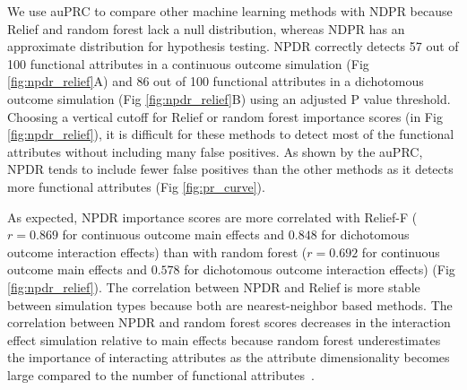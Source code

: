 \documentclass[10pt]{article}
\begin{document}
We use auPRC to compare other machine learning methods with NDPR because Relief and random forest lack a null distribution, whereas NDPR has an approximate distribution for hypothesis testing. NPDR correctly detects 57 out of 100 functional attributes in a continuous outcome simulation (Fig \ref{fig:npdr_relief}A) and 86 out of 100 functional attributes in a dichotomous outcome simulation (Fig \ref{fig:npdr_relief}B) using an adjusted P value threshold. Choosing a vertical cutoff for Relief or random forest importance scores (in Fig \ref{fig:npdr_relief}), it is difficult for these methods to detect most of the functional attributes without including many false positives. As shown by the auPRC, NPDR tends to include fewer false positives than the other methods as it detects more functional attributes (Fig \ref{fig:pr_curve}).

As expected, NPDR importance scores are more correlated with Relief-F ($r = 0.869$ for continuous outcome main effects and $0.848$ for dichotomous outcome interaction effects) than with random forest ($r = 0.692$ for continuous outcome main effects and $0.578$ for dichotomous outcome interaction effects) (Fig \ref{fig:npdr_relief}). The correlation between NPDR and Relief is more stable between simulation types because both are nearest-neighbor based methods. The correlation between NPDR and random forest scores decreases in the interaction effect simulation relative to main effects because random forest underestimates the importance of interacting attributes as the attribute dimensionality becomes large compared to the number of functional attributes~\cite{mckinney2009capturing,winham2012snp}.
\end{document}
